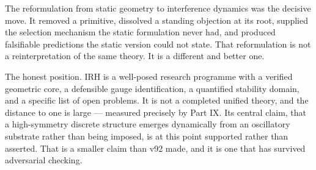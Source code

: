 \documentclass[11pt,a4paper]{article}
\begin{document}
The reformulation from static geometry to interference dynamics was the decisive move. It removed a primitive, dissolved a standing objection at its root, supplied the selection mechanism the static formulation never had, and produced falsifiable predictions the static version could not state. That reformulation is not a reinterpretation of the same theory. It is a different and better one.

The honest position. IRH is a well-posed research programme with a verified geometric core, a defensible gauge identification, a quantified stability domain, and a specific list of open problems. It is not a completed unified theory, and the distance to one is large --- measured precisely by Part IX. Its central claim, that a high-symmetry discrete structure emerges dynamically from an oscillatory substrate rather than being imposed, is at this point supported rather than asserted. That is a smaller claim than v92 made, and it is one that has survived adversarial checking.

\appendix
\end{document}
